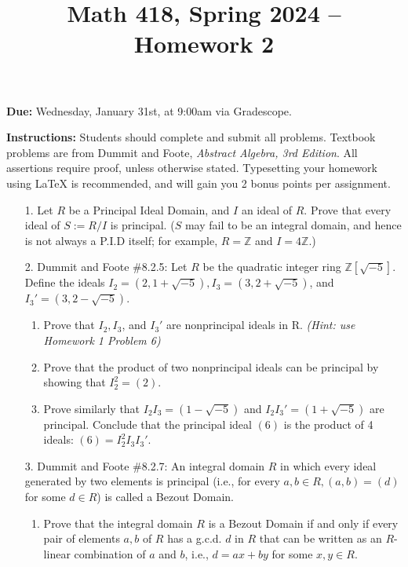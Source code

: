 \documentclass[12pt]{article}
\title{Math 418, Spring 2024 -- Homework 2}
\date{}
\newcommand{\Z}{\mathbb{Z}}
\begin{document}
 \maketitle
\vspace{-80pt}

\textbf{Due:} Wednesday, January 31st, at 9:00am via Gradescope.

\textbf{Instructions:} Students should complete and submit all problems. Textbook problems are from Dummit and Foote, \emph{Abstract Algebra, 3rd Edition}. All assertions require proof, unless otherwise stated. Typesetting your homework using LaTeX is recommended, and will gain you 2 bonus points per assignment.

\begin{enumerate}

\item[1.] Let $R$ be a Principal Ideal Domain, and $I$ an ideal of $R$. Prove that every ideal of $S := R/I$
is principal. ($S$ may fail to be an integral domain, and hence is not always a P.I.D itself; for example, $R = \Z$ and $I = 4\Z$.)

\item[2.] Dummit and Foote \#8.2.5: Let $R$ be the quadratic integer ring $\Z[\sqrt{-5}]$. Define the ideals $I_2 = (2, 1 + \sqrt{-5}), I_3 = (3, 2 + \sqrt{-5})$, and $I_3' = (3, 2 - \sqrt{-5})$.

\begin{enumerate}
    \item Prove that $I_2, I_3$, and $I_3'$ are nonprincipal ideals in R. \emph{(Hint: use Homework 1 Problem 6)}

    \item Prove that the product of two nonprincipal ideals can be principal by showing that $I_2^2 = (2)$.

    \item Prove similarly that $I_2I_3 = (1-\sqrt{-5})$ and $I_2I_3' = (1+\sqrt{-5})$ are principal. Conclude that the principal ideal $(6)$ is the product of 4 ideals: $(6) = I_2^2I_3I_3'$.

    
\end{enumerate}

\item[3.] Dummit and Foote \#8.2.7: An integral domain $R$ in which every ideal generated by two elements is principal (i.e., for every $a, b\in R, (a, b) = (d)$ for some $d\in R$) is called a Bezout Domain.

\begin{enumerate}
    \item Prove that the integral domain $R$ is a Bezout Domain if and only if every pair of elements $a, b$ of $R$ has a g.c.d. $d$ in $R$ that can be written as an $R$-linear combination of $a$ and $b$, i.e., $d = ax + by$ for some $x, y\in R$.


\end{enumerate}
\end{enumerate}
\end{document}
